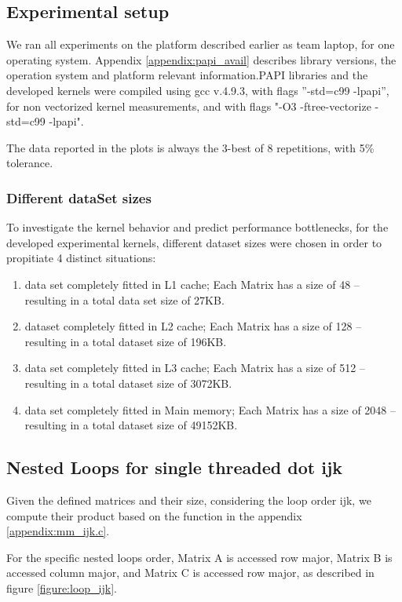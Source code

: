 \documentclass{sigplanconf}
\begin{document}
\subsection{Experimental  setup}
We  ran  all  experiments  on  the  platform described earlier as team laptop, for one operating system. Appendix \ref{appendix:papi_avail} describes library versions, the operation system and platform relevant information.PAPI libraries and the developed kernels were compiled using gcc v.4.9.3, with  flags  ”-std=c99  -lpapi”, for non vectorized kernel measurements, and with flags "-O3 -ftree-vectorize -std=c99 -lpapi". \par 
The
data  reported  in  the  plots  is  always  the 3-best  of 
8 repetitions,  with 5\% tolerance. \par 

\subsubsection{Different dataSet sizes}
To investigate the kernel behavior and predict performance bottlenecks, for the developed experimental kernels, different dataset sizes were chosen in order to propitiate 4 distinct situations:
\begin{enumerate}
\item data set completely fitted in L1 cache; Each Matrix has a size of 48 -- resulting in a total data set size of 27KB.
\item dataset completely fitted in L2 cache;  Each Matrix has a size of 128 -- resulting in a total dataset size of 196KB. 
\item data set completely fitted in L3 cache; Each Matrix has a size of 512 -- resulting in a total dataset size of  3072KB.
\item data set completely fitted in Main memory; Each Matrix has a size of 2048 -- resulting in a total dataset size of 49152KB.
\end{enumerate}

\subsection{Nested Loops for single threaded dot ijk}

Given the defined matrices and their size, considering the loop order ijk, we compute their product based on the function in the appendix \ref{appendix:mm_ijk.c}.

For the specific nested loops order, Matrix A is accessed row major, Matrix B is accessed column major, and Matrix C is accessed row major, as described in figure \ref{figure:loop_ijk}.
\end{document}
